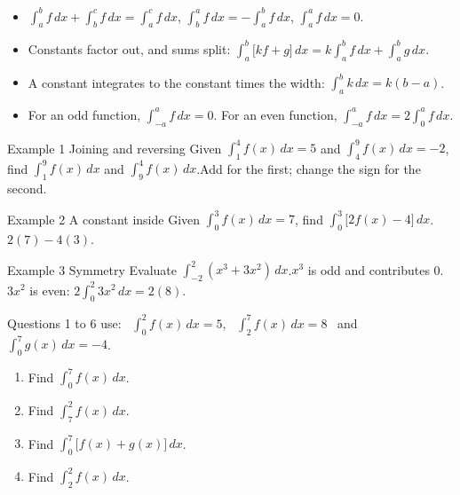 \documentclass[11pt]{article}
\begin{document}

\begin{ideabox}
\begin{itemize}[leftmargin=*,itemsep=2pt,topsep=2pt]
  \item $\displaystyle\int_{a}^{b}f\,dx+\displaystyle\int_{b}^{c}f\,dx=\displaystyle\int_{a}^{c}f\,dx$, \quad $\displaystyle\int_{b}^{a}f\,dx=-\displaystyle\int_{a}^{b}f\,dx$, \quad $\displaystyle\int_{a}^{a}f\,dx=0$.
  \item Constants factor out, and sums split: $\displaystyle\int_{a}^{b}\big[kf+g\big]\,dx=k\displaystyle\int_{a}^{b}f\,dx+\displaystyle\int_{a}^{b}g\,dx$.
  \item A constant integrates to the constant times the width: $\displaystyle\int_{a}^{b}k\,dx=k(b-a)$.
  \item For an odd function, $\displaystyle\int_{-a}^{a}f\,dx=0$. For an even function, $\displaystyle\int_{-a}^{a}f\,dx=2\displaystyle\int_{0}^{a}f\,dx$.
\end{itemize}
\end{ideabox}

\begin{example}{Example 1 \textperiodcentered{} Joining and reversing}
Given $\displaystyle\int_{1}^{4}f(x)\,dx=5$ and $\displaystyle\int_{4}^{9}f(x)\,dx=-2$, find $\displaystyle\int_{1}^{9}f(x)\,dx$ and $\displaystyle\int_{9}^{4}f(x)\,dx$.\soln Add for the first; change the sign for the second.
\end{example}

\begin{example}{Example 2 \textperiodcentered{} A constant inside}
Given $\displaystyle\int_{0}^{3}f(x)\,dx=7$, find $\displaystyle\int_{0}^{3}\big[2f(x)-4\big]\,dx$.\soln $2(7)-4(3)$.
\end{example}

\begin{example}{Example 3 \textperiodcentered{} Symmetry}
Evaluate $\displaystyle\int_{-2}^{2}\left(x^3+3x^2\right)\,dx$.\soln $x^3$ is odd and contributes 0. $3x^2$ is even: $2\displaystyle\int_{0}^{2}3x^2\,dx=2(8)$.
\end{example}

\newpage
{}
Questions 1 to 6 use: \ $\displaystyle\int_{0}^{2}f(x)\,dx=5$, \ $\displaystyle\int_{2}^{7}f(x)\,dx=8$ \ and \ $\displaystyle\int_{0}^{7}g(x)\,dx=-4$.
\begin{enumerate}[leftmargin=*,itemsep=2pt]
  \item Find $\displaystyle\int_{0}^{7}f(x)\,dx$.\work{2.3cm}
  \item Find $\displaystyle\int_{7}^{2}f(x)\,dx$.\work{2.3cm}
  \item Find $\displaystyle\int_{0}^{7}\big[f(x)+g(x)\big]\,dx$.\work{2.3cm}
  \item Find $\displaystyle\int_{2}^{2}f(x)\,dx$.\work{2.3cm}
\end{enumerate}
\end{document}
